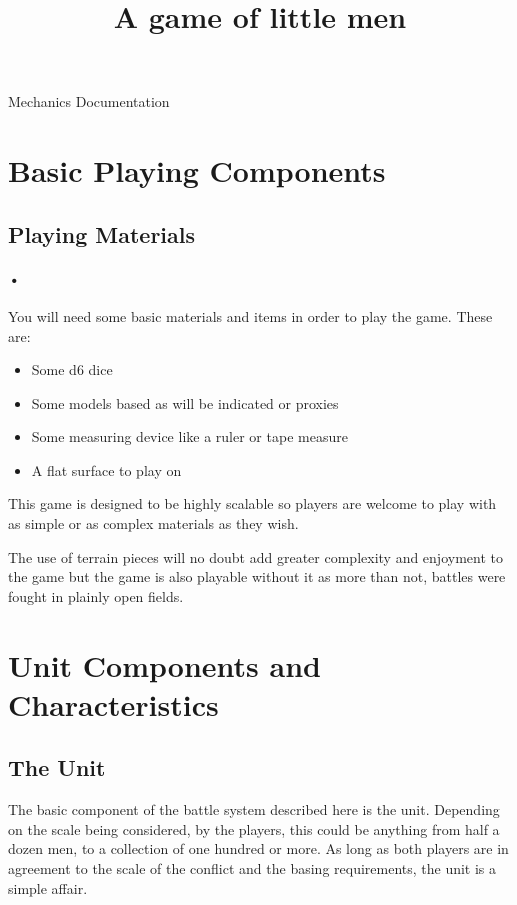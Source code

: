 \documentclass{article}
\begin{document}
\title{A game of little men}

\begin{titlepage}
\begin{huge}
Mechanics Documentation
\end{huge}
\end{titlepage}

\pagebreak

\tableofcontents

\pagebreak

\section{Basic Playing Components}
\subsection{Playing Materials}
\paragraph{•}
You will need some basic materials and items in order to play the game. These are:
\begin{itemize}
\item Some d6 dice
\item Some models based as will be indicated or proxies
\item Some measuring device like a ruler or tape measure
\item A flat surface to play on
\end{itemize}

This game is designed to be highly scalable so players are welcome to play with as simple or as complex materials as they wish.

The use of terrain pieces will no doubt add greater complexity and enjoyment to the game but the game is also playable without it as more than not, battles were fought in plainly open fields.

\section{Unit Components and Characteristics}
\subsection{The Unit}
The basic component of the battle system described here is the unit. Depending on the scale being considered, by the players, this could be anything from half a dozen men, to a collection of one hundred or more. As long as both players are in agreement to the scale of the conflict and the basing requirements, the unit is a simple affair.
\end{document}
